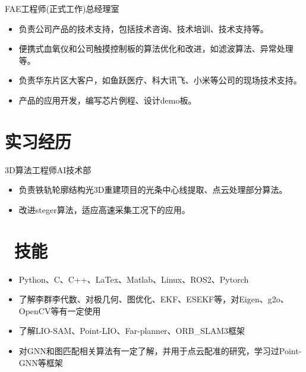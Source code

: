 \documentclass{resume}
\begin{document}
FAE工程师(正式工作)\qquad 总经理室
\begin{itemize}
  \item 负责公司产品的技术支持，包括技术咨询、技术培训、技术支持等。
  \item 便携式血氧仪和公司触摸控制板的算法优化和改进，如滤波算法、异常处理等。
  \item 负责华东片区大客户，如鱼跃医疗、科大讯飞、小米等公司的现场技术支持。
  \item 产品的应用开发，编写芯片例程、设计demo板。
\end{itemize}

\section{\textcolor[RGB]{50,50,190}{\faAlignLeft 实习经历}}

3D算法工程师\qquad \qquad \quad AI技术部
\begin{itemize}
  \item 负责铁轨轮廓结构光3D重建项目的光条中心线提取、点云处理部分算法。
  \item 改进steger算法，适应高速采集工况下的应用。
\end{itemize}

\section{\textcolor[RGB]{50,50,190}{\faCogs\ 技能}}
\begin{itemize}[parsep=0.5ex]
  \item Python、C、C++、LaTex、Matlab、Linux、ROS2、Pytorch
  \item 了解李群李代数、对极几何、图优化、EKF、ESEKF等，对Eigen、g2o、OpenCV等有一定使用
  \item 了解LIO-SAM、Point-LIO、Far-planner、ORB\_SLAM3框架
  \item 对GNN和图匹配相关算法有一定了解，并用于点云配准的研究，学习过Point-GNN等框架

\end{itemize}
\end{document}
